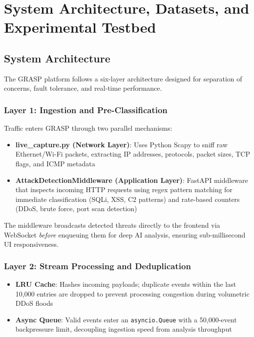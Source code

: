 \documentclass[12pt, a4paper]{report}
\begin{document}
\chapter{System Architecture, Datasets, and Experimental Testbed}

\section{System Architecture}

The GRASP platform follows a six-layer architecture designed for separation of concerns, fault tolerance, and real-time performance.

\subsection{Layer 1: Ingestion and Pre-Classification}

Traffic enters GRASP through two parallel mechanisms:

\begin{itemize}
    \item \textbf{live\_capture.py (Network Layer)}: Uses Python Scapy to sniff raw Ethernet/Wi-Fi packets, extracting IP addresses, protocols, packet sizes, TCP flags, and ICMP metadata
    \item \textbf{AttackDetectionMiddleware (Application Layer)}: FastAPI middleware that inspects incoming HTTP requests using regex pattern matching for immediate classification (SQLi, XSS, C2 patterns) and rate-based counters (DDoS, brute force, port scan detection)
\end{itemize}

The middleware broadcasts detected threats directly to the frontend via WebSocket \textit{before} enqueuing them for deep AI analysis, ensuring sub-millisecond UI responsiveness.

\subsection{Layer 2: Stream Processing and Deduplication}

\begin{itemize}
    \item \textbf{LRU Cache}: Hashes incoming payloads; duplicate events within the last 10,000 entries are dropped to prevent processing congestion during volumetric DDoS floods
    \item \textbf{Async Queue}: Valid events enter an \texttt{asyncio.Queue} with a 50,000-event backpressure limit, decoupling ingestion speed from analysis throughput
\end{itemize}
\end{document}
